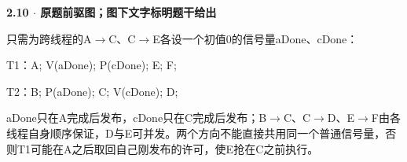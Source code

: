 {\color{ink}\bfseries 2.10 \(\cdot \) 原题前驱图；图下文字标明题干给出}\par\vspace{1bp}只需为跨线程的A\(\to \)C、C\(\to \)E各设一个初值0的信号量aDone、cDone：\par T1：A;\allowbreak{} V(aDone);\allowbreak{} P(cDone);\allowbreak{} E;\allowbreak{} F;\allowbreak{}\par T2：B;\allowbreak{} P(aDone);\allowbreak{} C;\allowbreak{} V(cDone);\allowbreak{} D;\allowbreak{}\par aDone只在A完成后发布，cDone只在C完成后发布；B\(\to \)C、C\(\to \)D、E\(\to \)F由各线程自身顺序保证，D与E可并发。两个方向不能直接共用同一个普通信号量，否则T1可能在A之后取回自己刚发布的许可，使E抢在C之前执行。
